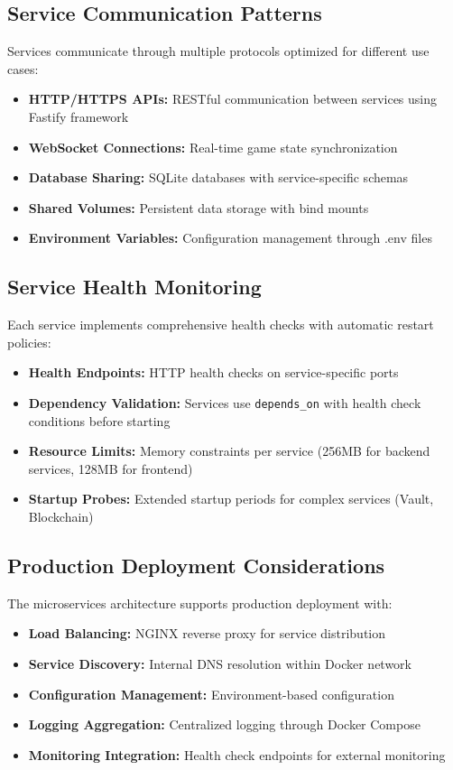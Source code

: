 \documentclass[11pt,a4paper]{report}
\begin{document}
\subsection{Service Communication Patterns}

Services communicate through multiple protocols optimized for different use cases:

\begin{itemize}
  \item \textbf{HTTP/HTTPS APIs:} RESTful communication between services using Fastify framework
  \item \textbf{WebSocket Connections:} Real-time game state synchronization
  \item \textbf{Database Sharing:} SQLite databases with service-specific schemas
  \item \textbf{Shared Volumes:} Persistent data storage with bind mounts
  \item \textbf{Environment Variables:} Configuration management through .env files
\end{itemize}

\subsection{Service Health Monitoring}

Each service implements comprehensive health checks with automatic restart policies:

\begin{itemize}
  \item \textbf{Health Endpoints:} HTTP health checks on service-specific ports
  \item \textbf{Dependency Validation:} Services use \texttt{depends\_on} with health check conditions before starting
  \item \textbf{Resource Limits:} Memory constraints per service (256MB for backend services, 128MB for frontend)
  \item \textbf{Startup Probes:} Extended startup periods for complex services (Vault, Blockchain)
\end{itemize}

\subsection{Production Deployment Considerations}

The microservices architecture supports production deployment with:

\begin{itemize}
  \item \textbf{Load Balancing:} NGINX reverse proxy for service distribution
  \item \textbf{Service Discovery:} Internal DNS resolution within Docker network
  \item \textbf{Configuration Management:} Environment-based configuration
  \item \textbf{Logging Aggregation:} Centralized logging through Docker Compose
  \item \textbf{Monitoring Integration:} Health check endpoints for external monitoring
\end{itemize}
\end{document}
